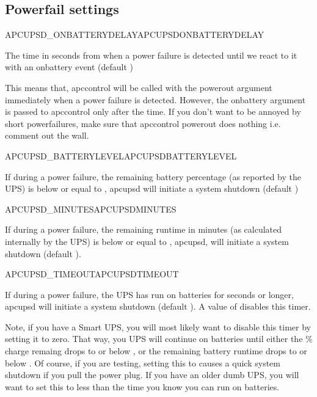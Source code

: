 \subsection{Powerfail settings}
\begin {description}

 {APCUPSD\_ONBATTERYDELAY}{APCUPSDONBATTERYDELAY}
  
  The time in seconds from when a power failure is detected until we react
  to it with an onbattery event (default )

  This means that, apccontrol will be called with the powerout argument
  immediately when a power failure is detected.  However, the
  onbattery argument is passed to apccontrol only after the 
   time.  
  If you don't want to be annoyed by short powerfailures, make sure that 
  apccontrol powerout does nothing i.e. comment out the wall.

 {APCUPSD\_BATTERYLEVEL}{APCUPSDBATTERYLEVEL}
 
  If during a power failure, the remaining battery percentage
  (as reported by the UPS) is below or equal to , 
  apcupsd will initiate a system shutdown (default )

 {APCUPSD\_MINUTES}{APCUPSDMINUTES}
 
  If during a power failure, the remaining runtime in minutes 
  (as calculated internally by the UPS) is below or equal to 
  ,  apcupsd, will initiate a system shutdown
  (default ).

 {APCUPSD\_TIMEOUT}{APCUPSDTIMEOUT}
 
  If during a power failure, the UPS has run on batteries for 
   seconds or longer, 
  apcupsd will initiate a system shutdown (default ).
  A value of  disables this timer.

  Note, if you have a Smart UPS, you will most likely want to disable
  this timer by setting it to zero. That way, you UPS will continue
  on batteries until either the \% charge remaing drops to or below
  , or the remaining battery runtime drops to or
  below .
  Of course, if you are testing, setting this to  causes a quick 
  system shutdown if you pull the power plug.   
  If you have an older dumb UPS, you will want to set this to less than
  the time you know you can run on batteries.
 

\end{description}
